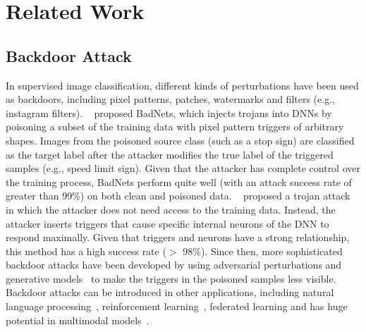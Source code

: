 \section{Related Work}
\label{sec:related}

\subsection{Backdoor Attack}
\label{sec:related-backdoor-attacks}
    In supervised image classification, different kinds of perturbations have been used as backdoors, including pixel patterns, patches, watermarks and filters (e.g., instagram filters).
    ~\citet{gu2017badnets} proposed BadNets, which injects trojans into DNNs by poisoning a subset of the training data with pixel pattern triggers of arbitrary shapes. Images from the poisoned source class (such as a stop sign) are classified as the target label after the attacker modifies the true label of the triggered samples (e.g., speed limit sign). Given that the attacker has complete control over the training process, BadNets perform quite well (with an attack success rate of greater than 99\%) on both clean and poisoned data.
    ~\citet{liu2017trojaning} proposed a trojan attack in which the attacker does not need access to the training data. Instead, the attacker inserts triggers that cause  specific internal neurons of the DNN to respond maximally. Given that triggers and neurons have a strong relationship, this method has a high success rate ($>$ 98\%). 
    Since then, more sophisticated backdoor attacks have been developed by using adversarial perturbations and generative models~\cite{turner2018clean} to make the triggers in the poisoned samples less visible. Backdoor attacks can be introduced in other applications, including natural language processing~\cite{chen2021badnl}, reinforcement learning~\cite{kiourti2020trojdrl}, federated learning and has huge potential in multimodal models~\cite{Zhang2022multimodalattack, Shi2022multimodalattackrs, Vartak2022thesis}.

